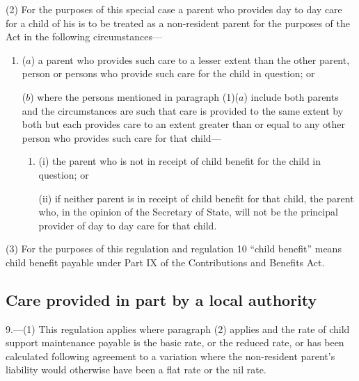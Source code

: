 \documentclass[12pt,a4paper]{article}
\begin{document}
(2) For the purposes of this special case a parent who provides day to day care for a child of his is to be treated as a non-resident parent for the purposes of the Act in the following circumstances—
\begin{enumerate}\item[]
($a$) a parent who provides such care to a lesser extent than the other parent, person or persons who provide such care for the child in question; or

($b$) where the persons mentioned in paragraph (1)($a$)  include both parents and the circumstances are such that care is provided to the same extent by both but each provides care to an extent greater than or equal to any other person who provides such care for that child—
\begin{enumerate}\item[]
(i) the parent who is not in receipt of child benefit for the child in question; or

(ii) if neither parent is in receipt of child benefit for that child, the parent who, in the opinion of the Secretary of State, will not be the principal provider of day to day care for that child.
\end{enumerate}
\end{enumerate}

(3) For the purposes of this regulation and regulation 10 “child benefit” means child benefit payable under Part IX of the Contributions and Benefits Act.


\subsection[9. Care provided in part by a local authority]{Care provided in part by a local authority}

9.---(1)  This regulation applies where paragraph (2) applies and the rate of child support maintenance payable is the basic rate, or the reduced rate, or has been calculated following agreement to a variation where the non-resident parent’s liability would otherwise have been a flat rate or the nil rate.
\end{document}
